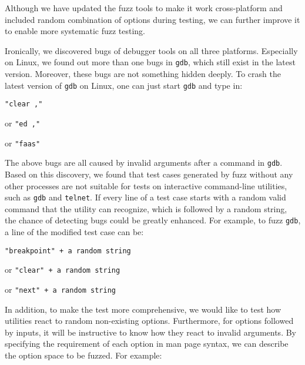 




Although we have updated the fuzz tools to make it work cross-platform and included random combination of options during testing, we can further improve it to enable more systematic fuzz testing.

Ironically, we discovered bugs of debugger tools on all three platforms. Especially on Linux, we found out more than one bugs in \texttt{gdb}, which still exist in the latest version. Moreover, these bugs are not something hidden deeply. To crash the latest version of \texttt{gdb} on Linux, one can just start \texttt{gdb} and type in:

\texttt{"clear ,"}

or \texttt{"ed ,"} 

or \texttt{"faas"}

The above bugs are all caused by invalid arguments after a command in \texttt{gdb}. Based on this discovery, we found that test cases generated by fuzz without any other processes are not suitable for tests on interactive command-line utilities, such as \texttt{gdb} and \texttt{telnet}. If every line of a test case starts with a random valid command that the utility can recognize, which is followed by a random string, the chance of detecting bugs could be greatly enhanced. For example, to fuzz \texttt{gdb}, a line of the modified test case can be:

\texttt{"breakpoint" + a random string}

or \texttt{"clear" + a random string}

or \texttt{"next" + a random string}

In addition, to make the test more comprehensive, we would like to test how utilities react to random non-existing options. Furthermore, for options followed by inputs, it will be instructive to know how they react to invalid arguments. By specifying the requirement of each option in man page syntax, we can describe the option space to be fuzzed. 
For example:


